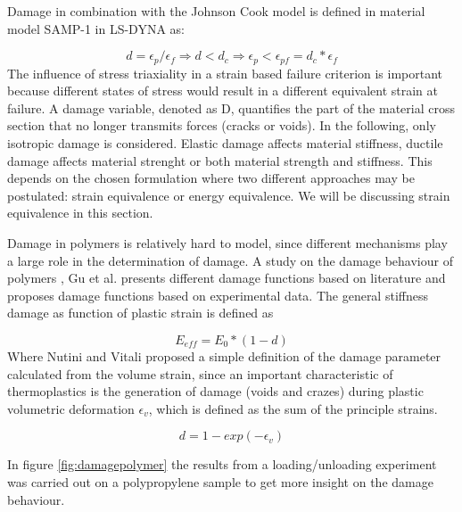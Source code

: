 Damage in combination with the Johnson Cook model is defined in material model SAMP-1 in LS-DYNA as:

\begin{equation}\label{AzziTsai}
d=\epsilon_p/\epsilon_f\Rightarrow d<d_c\Rightarrow\epsilon_p<\epsilon_{pf}=d_c*\epsilon_f
\end{equation}The influence of stress triaxiality in a strain based failure criterion is important because different states of stress would result in a different equivalent strain at failure\cite{BoisA:}. 
A damage variable, denoted as D, quantifies the part of the material cross section that no longer transmits forces (cracks or voids). In the following, only isotropic damage is considered. Elastic damage affects material stiffness, ductile damage affects material strenght or both material strength and stiffness. This depends on the chosen formulation where two different approaches may be postulated: strain equivalence or energy equivalence. We will be discussing strain equivalence in this section. 

Damage in polymers is relatively hard to model, since different mechanisms play a large role in the determination of damage. A study on the damage behaviour of polymers \cite{Gu2013ExperimentalThermoplastics}, Gu et al. presents different damage functions based on literature and proposes damage functions based on experimental data. 
The general stiffness damage as function of plastic strain is defined as

\begin{equation}\label{stiffnessdamage}
E_{eff}=E_0*(1-d)
\end{equation}Where Nutini and Vitali proposed a simple definition of the damage parameter calculated from the volume strain, since an important characteristic of thermoplastics is the generation of damage (voids and crazes) during plastic volumetric deformation $\epsilon_v$, which is defined as the sum of the principle strains.

\begin{equation}\label{AzziTsai}
d=1-exp(-\epsilon_v)
\end{equation}

In figure \ref{fig:damagepolymer} the results from a loading/unloading experiment was carried out on a polypropylene sample to get more insight on the damage behaviour. 

